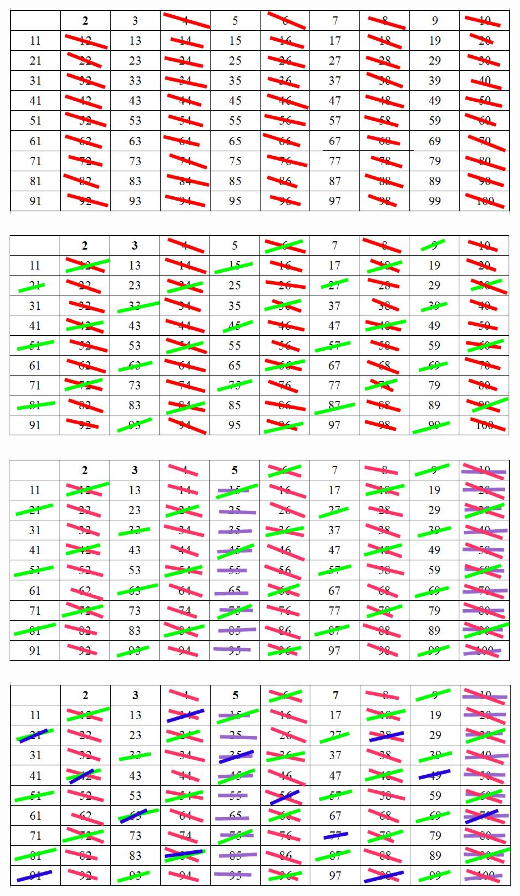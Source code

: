 \documentclass{article}
\begin{document}
\begin{krok} \includegraphics[scale=0.4]{2.jpg} \end{krok}
\begin{krok} \includegraphics[scale=0.4]{3.jpg} \end{krok}
\begin{krok} \includegraphics[scale=0.4]{4.jpg} \end{krok}
\begin{krok} \includegraphics[scale=0.4]{5.jpg} \end{krok}
\end{document}
